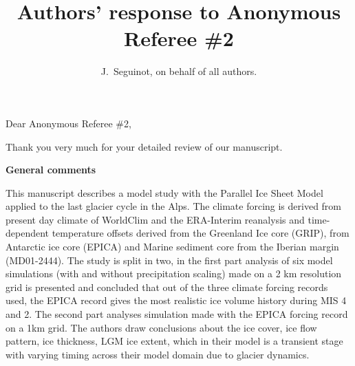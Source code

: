 

\title{Authors' response to Anonymous Referee \#2}
\author{J.~Seguinot, on behalf of all authors.}


\maketitle
\bigskip


\newcommand{\sechead}[1]{\bigskip\noindent\textbf{#1}}
\newcommand{\referee}[1]{\bigskip\noindent\textcolor{journalname}{#1}}
\newcommand{\msquote}[1]{\begin{quote}\textit{#1}\end{quote}}
\newcommand{\doi}[1]{doi:\allowbreak\href{http://dx.doi.org/#1}{#1}}

Dear Anonymous Referee \#2,

Thank you very much for your detailed review of our manuscript.



\sechead{General comments}

    \referee{%
        This manuscript describes a model study with the Parallel Ice Sheet
        Model applied to the last glacier cycle in the Alps. The climate
        forcing is derived from present day climate of WorldClim and the
        ERA-Interim reanalysis and time-dependent temperature offsets derived
        from the Greenland Ice core (GRIP), from Antarctic ice core (EPICA) and
        Marine sediment core from the Iberian margin (MD01-2444). The study is
        split in two, in the first part analysis of six model simulations (with
        and without precipitation scaling) made on a 2 km resolution grid is
        presented and concluded that out of the three climate forcing records
        used, the EPICA record gives the most realistic ice volume history
        during MIS 4 and 2. The second part analyses simulation made with the
        EPICA forcing record on a 1km grid. The authors draw conclusions about
        the ice cover, ice flow pattern, ice thickness, LGM ice extent, which
        in their model is a transient stage with varying timing across their
        model domain due to glacier dynamics.}

